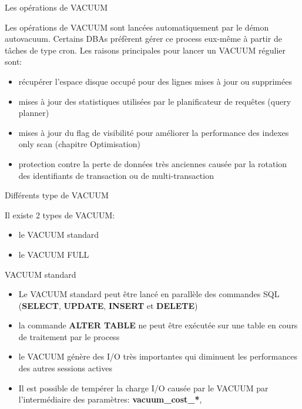 \begin{frame}[fragile]{Les opérations de VACUUM}

   Les opérations de VACUUM sont lancées automatiquement par le démon \textsf{autovacuum}. Certains DBAs préfèrent gérer ce process eux-même à partir de tâches de type cron.
   Les raisons principales pour lancer un VACUUM régulier sont:

   \begin{itemize}
      \item récupérer l'espace disque occupé pour des lignes mises à jour ou supprimées
      \item mises à jour des statistiques utilisées par le planificateur de requêtes (query planner)
      \item mises à jour du flag de visibilité pour améliorer la performance des indexes only scan (chapitre Optimisation)
      \item protection contre la perte de données très anciennes causée par la rotation des identifiants de transaction ou de multi-transaction
   \end{itemize}

\begin{toile}
\end{toile}

\end{frame}


\begin{frame}{Différents type de VACUUM}

   Il existe 2 types de VACUUM:
   \begin{itemize}
      \item le VACUUM standard
      \item le VACUUM FULL 
   \end{itemize}

\end{frame}


\begin{frame}{VACUUM standard}

   \begin{itemize}
      \item Le VACUUM standard peut être lancé en parallèle des commandes SQL (\textbf{SELECT}, \textbf{UPDATE}, \textbf{INSERT} et \textbf{DELETE})
      \item la commande \textbf{ALTER TABLE} ne peut être exécutée sur une table en cours de traitement par le process
      \item le VACUUM génère des I/O très importantes qui diminuent les performances des autres sessions actives
      \item Il est possible de tempérer la charge I/O causée par le VACUUM par l'intermédiaire des paramètres: \textbf{vacuum\_cost\_*},
   \end{itemize}

\end{frame}

